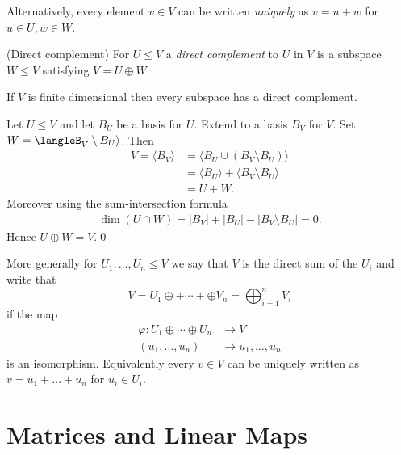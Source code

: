 \documentclass{article}
\begin{document}
Alternatively, every element $ v\in V $ can be written \textit{uniquely} as $ v=u+w $ for $ u\in U, w\in W $.
\begin{definition}
	(Direct complement) For $ U\le V $ a \textit{direct complement} to $ U $ in $ V $ is a subspace $ W\le V $ satisfying $ V=U\oplus W $.
\end{definition}
\begin{proposition}
  If $ V $ is finite dimensional then every subspace has a direct complement.
\end{proposition}
\pf Let $ U\le V $ and let $ B_U $ be a basis for $ U $. Extend to a basis $ B_V $ for $ V $. Set $ W=\langleB_V\setminus B_U\rangle $. Then
\begin{align*}
	V=\langle B_V\rangle &= \langle B_U\cup (B_V\setminus B_U)\rangle\\
			     &= \langle B_U\rangle + \langle B_V\setminus B_U\rangle \\
			     &=U+W.
\end{align*}
Moreover using the sum-intersection formula
\begin{align*}
	\dim (U\cap W)=|B_V|+|B_U|-|B_V\setminus B_U|=0.
\end{align*}
Hence $ U\oplus W=V $.\qed\par
More generally for $ U_1,\dots, U_n\le V $ we say that $ V $ is the direct sum of the $ U_i $ and write that
\[
	V=U_1\oplus+\cdots +\oplus V_n=\bigoplus_{i=1}^n V_i
\]
if the map
\begin{align*}
	\varphi: U_1\oplus\cdots\oplus U_n &\to V\\
	(u_1,\dots, u_n) &\to u_1,\dots, u_n
\end{align*}
is an isomorphism. Equivalently every $ v\in V $ can be uniquely written as $ v=u_1+\dots +u_n $ for $ u_i\in U_i $.
\section{Matrices and Linear Maps}
\end{document}
